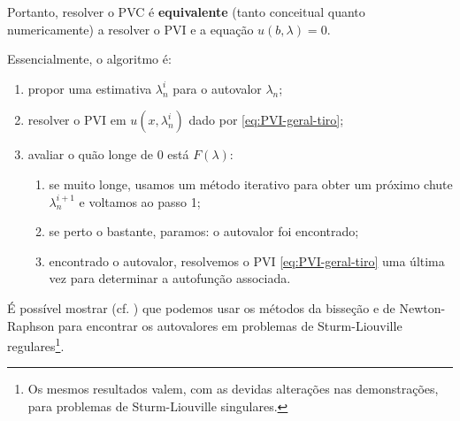 \documentclass[twocolumn,showpacs,%
  nofootinbib,aps,superscriptaddress,%
  eqsecnum,prd,notitlepage,showkeys,10pt]{revtex4-1}
\begin{document}
Portanto, resolver o PVC é \textbf{equivalente} (tanto conceitual quanto numericamente)
a resolver o PVI e a equação $u(b,\lambda) = 0$.

Essencialmente, o algoritmo é:
%
\begin{enumerate}
    \item propor uma estimativa $\lambda_n^i$ para o autovalor $\lambda_n$; 
    \item resolver o PVI em $u(x, \lambda_n^i)$ dado por \eqref{eq:PVI-geral-tiro};
    \item avaliar o quão longe de $0$ está $F(\lambda)$:
    \begin{enumerate}
        \item se muito longe, usamos um método iterativo para obter um próximo 
        chute $\lambda_n^{i+1}$ e voltamos ao passo 1;
        \item se perto o bastante, paramos: o autovalor foi encontrado;
        \item encontrado o autovalor, resolvemos o PVI \eqref{eq:PVI-geral-tiro} uma
        última vez para determinar a autofunção associada.
    \end{enumerate}
\end{enumerate}
%
É possível mostrar (cf. \cite[p.~304-305, Teo.~186 - 188]{Sturm-Liouville}) que
podemos usar os métodos da bisseção e de Newton-Raphson para encontrar os autovalores
em problemas de Sturm-Liouville regulares\footnote{Os mesmos resultados valem, com as devidas
alterações nas demonstrações, para problemas de Sturm-Liouville singulares.}.
\end{document}
